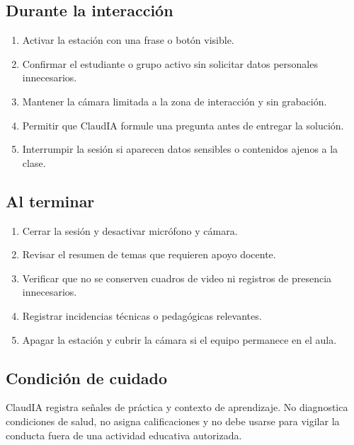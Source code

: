\documentclass[letterpaper,11pt]{article}
\begin{document}
\subsection*{Durante la interacción}
\begin{enumerate}
  \item Activar la estación con una frase o botón visible.
  \item Confirmar el estudiante o grupo activo sin solicitar datos personales innecesarios.
  \item Mantener la cámara limitada a la zona de interacción y sin grabación.
  \item Permitir que ClaudIA formule una pregunta antes de entregar la solución.
  \item Interrumpir la sesión si aparecen datos sensibles o contenidos ajenos a la clase.
\end{enumerate}

\subsection*{Al terminar}
\begin{enumerate}
  \item Cerrar la sesión y desactivar micrófono y cámara.
  \item Revisar el resumen de temas que requieren apoyo docente.
  \item Verificar que no se conserven cuadros de video ni registros de presencia innecesarios.
  \item Registrar incidencias técnicas o pedagógicas relevantes.
  \item Apagar la estación y cubrir la cámara si el equipo permanece en el aula.
\end{enumerate}

\subsection*{Condición de cuidado}
ClaudIA registra señales de práctica y contexto de aprendizaje. No diagnostica condiciones de salud, no asigna calificaciones y no debe usarse para vigilar la conducta fuera de una actividad educativa autorizada.
\end{document}
